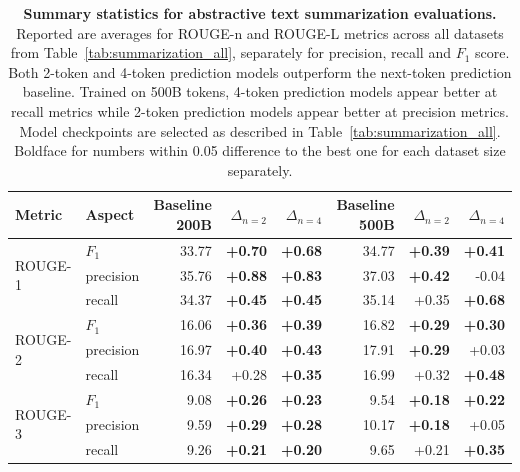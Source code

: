 \begin{table}[ht!]
\centering
\caption{\textbf{Summary statistics for abstractive text summarization evaluations.} 
Reported are averages for ROUGE-n and ROUGE-L metrics across all datasets from Table~\ref{tab:summarization_all}, separately for precision, recall and $F_1$ score. Both 2-token and 4-token prediction models outperform the next-token prediction baseline. Trained on 500B tokens, 4-token prediction models appear better at recall metrics while 2-token prediction models appear better at precision metrics. Model checkpoints are selected as described in Table~\ref{tab:summarization_all}. Boldface for numbers within 0.05 difference to the best one for each dataset size separately.}
\label{tab:summarization_avgs}
\begin{tabular}{llrrrrrr}
\toprule
Metric & Aspect & Baseline 200B & $\Delta_{n=2}$ & $\Delta_{n=4}$ & Baseline 500B & $\Delta_{n=2}$ & $\Delta_{n=4}$ \\
\midrule
\multirow{3}{*}{ROUGE-1} & $F_1$ &  33.77 &         \textbf{+0.70} &         \textbf{+0.68} &  34.77 &         \textbf{+0.39} &         \textbf{+0.41} \\
           & precision &  35.76 &         \textbf{+0.88} &         \textbf{+0.83} &  37.03 &         \textbf{+0.42} &        -0.04 \\
           & recall &  34.37 &         \textbf{+0.45} &         \textbf{+0.45} &  35.14 &         +0.35 &         \textbf{+0.68} \\
\midrule
\multirow{3}{*}{ROUGE-2} & $F_1$ &  16.06 &         \textbf{+0.36} &         \textbf{+0.39} &  16.82 &         \textbf{+0.29} &         \textbf{+0.30} \\
           & precision &  16.97 &         \textbf{+0.40} &         \textbf{+0.43} &  17.91 &         \textbf{+0.29} &         +0.03 \\
           & recall &  16.34 &         +0.28 &         \textbf{+0.35} &  16.99 &         +0.32 &         \textbf{+0.48} \\
\midrule
\multirow{3}{*}{ROUGE-3} & $F_1$ &   9.08 &         \textbf{+0.26} &         \textbf{+0.23} &   9.54 &         \textbf{+0.18} &         \textbf{+0.22} \\
           & precision &   9.59 &         \textbf{+0.29} &         \textbf{+0.28} &  10.17 &         \textbf{+0.18} &         +0.05 \\
           & recall &   9.26 &         \textbf{+0.21} &         \textbf{+0.20} &   9.65 &         +0.21 &         \textbf{+0.35} \\

\end{tabular}
\end{table}
